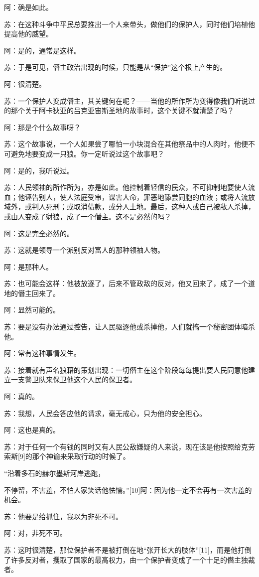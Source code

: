 \documentclass[12pt,oneside]{book}
\begin{document}
阿：确是如此。

苏：在这种斗争中平民总要推出一个人来带头，做他们的保护人，同时他们培植他提高他的威望。

阿：是的，通常是这样。

苏：于是可见，僭主政治出现的时候，只能是从“保护”这个根上产生的。

阿：很清楚。

苏：一个保护人变成僭主，其关键何在呢？——当他的所作所为变得像我们听说过的那个关于阿卡狄亚的吕克亚宙斯圣地的故事时，这个关键不就清楚了吗？

阿：那是个什么故事呀？

苏：这个故事说，一个人如果尝了哪怕一小块混合在其他祭品中的人肉时，他便不可避免地要变成一只狼。你一定听说过这个故事吧？

阿：是的，我听说过。

苏：人民领袖的所作所为，亦是如此。他控制着轻信的民众，不可抑制地要使人流血；他诬告别人，使人法庭受审，谋害人命，罪恶地舔尝同胞的血液；或将人流放域外，或判人死刑；或取消债款，或分人土地。最后，这种人或自己被敌人杀掉，或由人变成了豺狼，成了一个僭主。这不是必然的吗？

阿：这是完全必然的。

苏：这就是领导一个派别反对富人的那种领袖人物。

阿：是那种人。

苏：也可能会这样：他被放逐了，后来不管政敌的反对，他又回来了，成了一个道地的僭主回来了。

阿：显然可能的。

苏：要是没有办法通过控告，让人民驱逐他或杀掉他，人们就搞一个秘密团体暗杀他。

阿：常有这种事情发生。

苏：接着就有声名狼藉的策划出现：一切僭主在这个阶段每每提出要人民同意他建立一支警卫队来保卫他这个人民的保卫者。

阿：真的。

苏：我想，人民会答应他的请求，毫无戒心，只为他的安全担心。

阿：这也是真的。

苏：对于任何一个有钱的同时又有人民公敌嫌疑的人来说，现在该是他按照给克劳索斯[9]的那个神谕来采取行动的时候了。

“沿着多石的赫尔墨斯河岸逃跑，

不停留，不害羞，不怕人家笑话他怯懦。”[10]阿：因为他一定不会再有一次害羞的机会。

苏：他要是给抓住，我以为非死不可。

阿：对，非死不可。

苏：这时很清楚，那位保护者不是被打倒在地“张开长大的肢体”[11]，而是他打倒了许多反对者，攫取了国家的最高权力，由一个保护者变成了一个十足的僭主独裁者。
\end{document}
